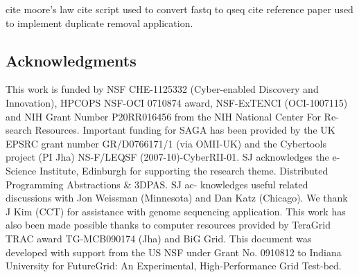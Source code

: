 \documentclass{acm_proc_article-sp}
\begin{document}
cite moore's law
cite script used to convert fastq to qseq
cite reference paper used to implement duplicate removal application.


\subsection*{Acknowledgments}
\scriptsize
This work is funded by NSF CHE-1125332 (Cyber-enabled Discovery and
Innovation), HPCOPS NSF-OCI 0710874 award, NSF-ExTENCI (OCI-1007115) and NIH
Grant Number P20RR016456 from the NIH National Center For Re- search
Resources. Important funding for SAGA has been provided by the UK EPSRC grant
number GR/D0766171/1 (via OMII-UK) and the Cybertools project (PI Jha) 
NS-F/LEQSF (2007-10)-CyberRII-01. SJ acknowledges the e-Science Institute,
Edinburgh for supporting the research theme. Distributed Programming
Abstractions \& 3DPAS. SJ ac- knowledges useful related discussions with Jon
Weissman (Minnesota) and Dan Katz (Chicago). We thank J Kim (CCT) for
assistance with genome sequencing application. This work has also been made
possible thanks to computer resources provided by TeraGrid TRAC award
TG-MCB090174 (Jha) and BiG Grid. This document was developed with support from
the US NSF under Grant No. 0910812 to Indiana University for FutureGrid: An
Experimental, High-Performance Grid Test-bed.
\end{document}
